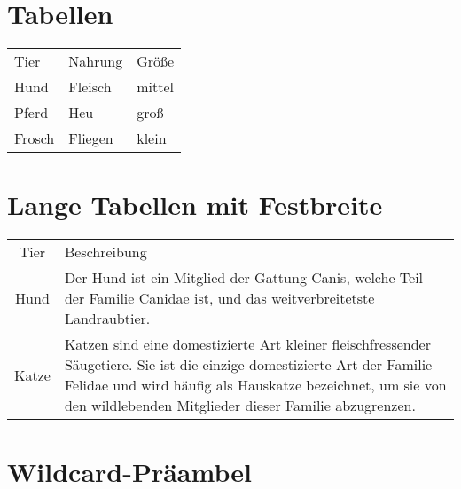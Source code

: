 \documentclass[a4paper]{article}
\begin{document}
\section{Tabellen}


\begin{tabular}{lll}
    Tier   & Nahrung & Größe  \\
    Hund   & Fleisch & mittel \\
    Pferd  & Heu     & groß   \\
    Frosch & Fliegen & klein  \\
\end{tabular}

\section{Lange Tabellen mit Festbreite}

\begin{tabular}{cp{9cm}}
    Tier  & Beschreibung                                                         \\
    Hund  & Der Hund ist ein Mitglied der Gattung Canis, welche Teil der Familie
    Canidae ist, und das weitverbreitetste Landraubtier.                         \\
    Katze & Katzen sind eine domestizierte Art kleiner fleischfressender
    Säugetiere. Sie ist die einzige domestizierte Art der Familie Felidae
    und wird häufig als Hauskatze bezeichnet, um sie von den wildlebenden
    Mitglieder dieser Familie abzugrenzen.                                       \\
\end{tabular}

\section{Wildcard-Präambel}
\end{document}
